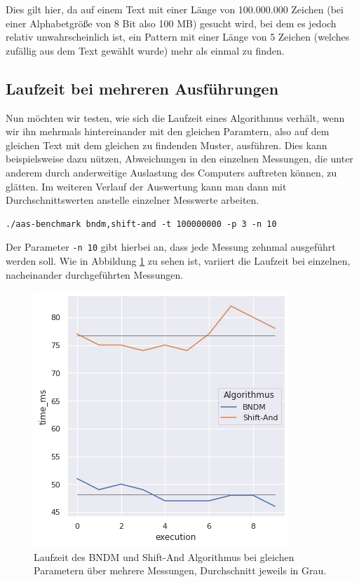 \documentclass[twocolumn]{article}
\begin{document}
Dies gilt hier, da auf einem Text mit einer Länge von 100.000.000 Zeichen (bei einer Alphabetgröße von 8 Bit also 100 MB) gesucht wird, bei dem es jedoch relativ unwahrscheinlich ist, ein Pattern mit einer Länge von 5 Zeichen (welches zufällig aus dem Text gewählt wurde) mehr als einmal zu finden.

\subsection*{Laufzeit bei mehreren Ausführungen}

Nun möchten wir testen, wie sich die Laufzeit eines Algorithmus verhält, wenn wir ihn mehrmals hintereinander mit den gleichen Paramtern, also auf dem gleichen Text mit dem gleichen zu findenden Muster, ausführen. Dies kann beispielsweise dazu nützen, Abweichungen in den einzelnen Messungen, die unter anderem durch anderweitige Auslastung des Computers auftreten können, zu glätten. Im weiteren Verlauf der Auswertung kann man dann mit Durchschnittswerten anstelle einzelner Messwerte arbeiten.

\begin{lstlisting}[breaklines=true,autogobble=true]
    ./aas-benchmark bndm,shift-and -t 100000000 -p 3 -n 10
\end{lstlisting}

Der Parameter \texttt{-n 10} gibt hierbei an, dass jede Messung zehnmal ausgeführt werden soll. Wie in Abbildung \ref{fig:runtime_bndm_shift_and} zu sehen ist, variiert die Laufzeit bei einzelnen, nacheinander durchgeführten Messungen.

\begin{figure}
    \includegraphics[width=\linewidth]{assets/graph_3.png}
    \caption{Laufzeit des BNDM und Shift-And Algorithmus bei gleichen Parametern über mehrere Messungen, Durchschnitt jeweils in Grau.}
    \label{fig:runtime_bndm_shift_and}
\end{figure}
\end{document}
